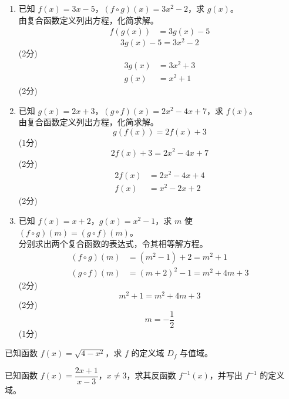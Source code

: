 \documentclass[12pt,a4paper]{exam-zh}
\newcommand{\qscore}[1]{%
    \unskip\nobreak\hfill
    \makebox[0pt][l]{\makebox[4em][r]{(#1\%)}}%
}
\begin{document}
\begin{solution}
    \begin{enumerate}[label=(\alph*)]
        \item 已知 $f(x) = 3x - 5$，$(f \circ g)(x) = 3x^2 - 2$，求 $g(x)$。 \\
        由复合函数定义列出方程，化简求解。
        \begin{align*}
            f(g(x)) &= 3g(x) - 5
        \end{align*}
        \[
            3g(x) - 5 = 3x^2 - 2
        \]
        \hfill (2分)
        \begin{align*}
            3g(x) &= 3x^2 + 3 \\
            g(x) &= x^2 + 1
        \end{align*}
        \hfill (2分)

        \item 已知 $g(x) = 2x + 3$，$(g \circ f)(x) = 2x^2 - 4x + 7$，求 $f(x)$。 \\
        由复合函数定义列出方程，化简求解。
        \[
            g(f(x)) = 2f(x) + 3
        \]
        \hfill (1分)
        \[
            2f(x) + 3 = 2x^2 - 4x + 7
        \]
        \hfill (2分)
        \begin{align*}
            2f(x) &= 2x^2 - 4x + 4 \\
            f(x) &= x^2 - 2x + 2
        \end{align*}
        \hfill (2分)

        \item 已知 $f(x) = x + 2$，$g(x) = x^2 - 1$，求 $m$ 使 $(f \circ g)(m) = (g \circ f)(m)$。 \\
        分别求出两个复合函数的表达式，令其相等解方程。
        \begin{align*}
            (f \circ g)(m) &= (m^2 - 1) + 2 = m^2 + 1 \\
            (g \circ f)(m) &= (m + 2)^2 - 1 = m^2 + 4m + 3
        \end{align*}
        \hfill (2分)
        \[
            m^2 + 1 = m^2 + 4m + 3
        \]
        \hfill (2分)
        \[
            m = -\frac{1}{2}
        \]
        \hfill (1分)
    \end{enumerate}
\end{solution}

\begin{question}[points = 12]
    \begin{questionparts}
        \item 已知函数 $f(x) = \sqrt{4 - x^2}$，求 $f$ 的定义域 $D_f$ 与值域。 \qscore{4}

        \item 已知函数 $f(x) = \dfrac{2x + 1}{x - 3}$，$x \neq 3$，求其反函数 $f^{-1}(x)$，并写出 $f^{-1}$ 的定义域。 \qscore{6}
    \end{questionparts}
\end{question}
\end{document}
